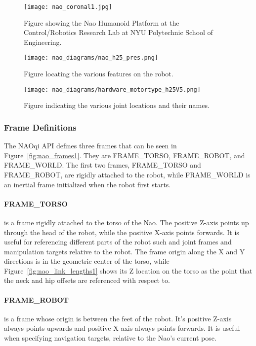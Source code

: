 \begin{figure}
\centering
\texttt{[image: nao\_coronal1.jpg]}
\caption{Figure showing the Nao Humanoid Platform at the Control/Robotics
         Research Lab at NYU Polytechnic School of Engineering.}
\label{fig:crrl_nao_coronal1}
\end{figure}

\begin{figure}
\centering
\texttt{[image: nao\_diagrams/nao\_h25\_pres.png]}
\caption{Figure locating the various features on the robot.}
\label{fig:nao_features1}
\end{figure}

\begin{figure}
\centering
\texttt{[image: nao\_diagrams/hardware\_motortype\_h25V5.png]}
\caption{Figure indicating the various joint locations and their names.}
\label{fig:nao_joints1}
\end{figure}

\FloatBarrier

\subsubsection{Frame Definitions}
The NAOqi API defines three frames that can be seen in Figure~\ref{fig:nao_frames1}.
They are FRAME\_TORSO, FRAME\_ROBOT, and FRAME\_WORLD\@.
The first two frames, FRAME\_TORSO and FRAME\_ROBOT, are rigidly
attached to the robot, while FRAME\_WORLD is an inertial frame initialized
when the robot first starts.

\paragraph{FRAME\_TORSO} 
is a frame rigidly attached to the torso of the Nao. The positive Z-axis points
up through the head of the robot, while the positive X-axis points forwards.
It is useful for referencing different parts of the robot such and joint frames
and manipulation targets relative to the robot.
The frame origin along the X and Y directions is in the geometric center
of the torso, while Figure~\ref{fig:nao_link_lengths1} shows its Z location on
the torso as the point that the neck and hip offsets are referenced with
respect to.

\paragraph{FRAME\_ROBOT}
is a frame whose origin is between the feet of the robot. It's positive Z-axis
always points upwards and positive X-axis always points forwards. It is useful
when specifying navigation targets, relative to the Nao's current pose.

